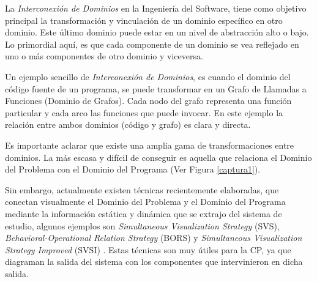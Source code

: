 La \textit{Interconexión de Dominios} en la Ingeniería del Software, tiene como objetivo principal la transformación y vinculación de un dominio específico en otro dominio. Este último dominio puede estar en un nivel de abstracción alto o bajo. Lo primordial aquí, es que cada componente de un dominio se vea reflejado en uno o más componentes de otro dominio y viceversa.


Un ejemplo sencillo de \textit{Interconexión de Dominios}, es cuando el dominio del código fuente de un programa, se puede transformar en un Grafo de Llamadas a Funciones (Dominio de Grafos). Cada nodo del grafo representa una función particular y cada arco las funciones que puede invocar. En este ejemplo la relación entre ambos dominios (código y grafo) es clara y directa. 

Es importante aclarar que existe una amplia gama de transformaciones entre dominios. La más escasa y difícil de conseguir es aquella que relaciona el Dominio del Problema con el Dominio del Programa (Ver Figura \ref{captura1}).

Sin embargo, actualmente existen técnicas recientemente elaboradas, que conectan visualmente el Dominio del Problema y el Dominio del Programa mediante la información estática y dinámica que se extrajo del sistema de estudio, algunos ejemplos son \textit{Simultaneous Visualization Strategy} (SVS), \textit{Behavioral-Operational Relation Strategy} (BORS) y \textit{Simultaneous Visualization Strategy Improved} (SVSI) \cite{BRM10,MPMR07,MBPHRU10}. Estas técnicas son muy útiles para la CP, ya que diagraman la salida del sistema con los componentes que intervinieron  en dicha salida.


